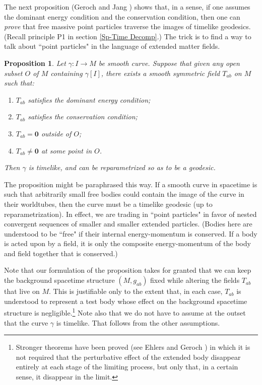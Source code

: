 \documentclass [12] {article}
\theoremstyle{plain}
\newtheorem{proposition}{Proposition}[subsection]
\numberwithin{figure}{subsection}
\numberwithin{proposition}{subsection}
\begin{document}
The next proposition (Geroch and Jang )  shows that, in a sense, if  one assumes the dominant energy condition and the conservation condition, then one can \emph{prove} that free massive point particles traverse the images of timelike geodesics. (Recall principle P1 in section \ref{Sp-Time Decomp}.)  The trick is to find a way to talk about ``point particles" in the language of extended matter fields.

\begin{proposition}  \label{Geroch-Jang} 
Let $\gamma: I \rightarrow M$ be smooth curve. Suppose that given any open subset $O$ of $M$ containing $\gamma [I]$, there exists a smooth symmetric field $T_{ab}$ on $M$ such that:
\begin{enumerate}
\vspace{-.8em}
\item[(1)]  $T_{ab}$ satisfies the dominant energy condition; 
\vspace{-.4em}
\item[(2)]  $T_{ab}$ satisfies the conservation condition;
\vspace{-.4em}
\item[(3)]  $T_{ab} = \mathbf{0}$ outside of $O$; 
\vspace{-.4em}
\item[(4)]  $T_{ab} \neq \mathbf{0}$ at some point in $O$.  
\end{enumerate}
\vspace{-.8em}
Then $\gamma$ is timelike, and can be reparametrized so as to be a geodesic.
\end{proposition}


The proposition might be paraphrased this way.  If a smooth curve in spacetime is such that arbitrarily small free bodies could contain the image of the curve in their worldtubes, then the  curve must be a timelike geodesic (up to reparametrization). In effect, we are trading in ``point particles" in  favor of nested convergent sequences of smaller and smaller extended particles. (Bodies here are understood to be ``free" if their internal energy-momentum is conserved. If a  body is acted upon by a field, it is only the composite energy-momentum of the body and field together that is conserved.) 

Note that our formulation of the proposition takes for granted that we can keep the background spacetime structure $(M, g_{ab})$ fixed while altering the fields $T_{ab}$ that live on $M$.   This is justifiable only to the extent that, in each case, $T_{ab}$ is understood to represent a test body whose effect on the background spacetime structure is negligible.\footnote{Stronger theorems have been proved (see Ehlers and Geroch ) in which it is not required that the perturbative effect  of the extended body disappear entirely at each stage of the limiting process, but only that,  in a certain sense,  it disappear in the limit.} 
Note also that we do  not have to assume at the outset that the curve $\gamma$ is timelike.  That follows from the other assumptions.
\end{document}
